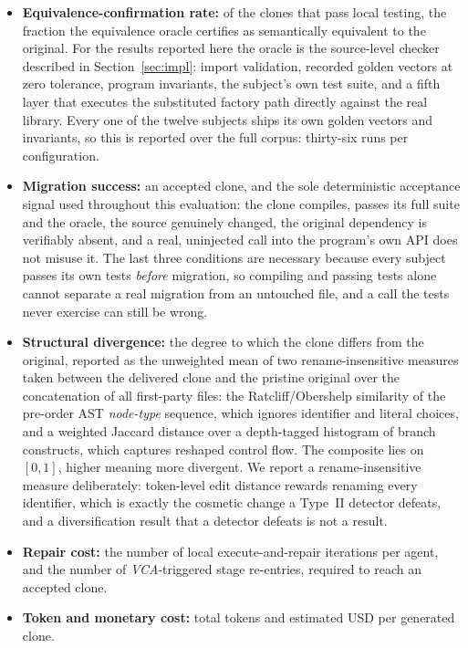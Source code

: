 \begin{itemize}
    \item \textbf{Equivalence-confirmation rate:} of the clones that pass local testing, the fraction the equivalence oracle certifies as semantically equivalent to the original. For the results reported here the oracle is the source-level checker described in Section~\ref{sec:impl}: import validation, recorded golden vectors at zero tolerance, program invariants, the subject's own test suite, and a fifth layer that executes the substituted factory path directly against the real library. Every one of the twelve subjects ships its own golden vectors and invariants, so this is reported over the full corpus: thirty-six runs per configuration.
    \item \textbf{Migration success:} an accepted clone, and the sole deterministic acceptance signal used throughout this evaluation: the clone compiles, passes its full suite and the oracle, the source genuinely changed, the original dependency is verifiably absent, and a real, uninjected call into the program's own API does not misuse it. The last three conditions are necessary because every subject passes its own tests \emph{before} migration, so compiling and passing tests alone cannot separate a real migration from an untouched file, and a call the tests never exercise can still be wrong.
    \item \textbf{Structural divergence:} the degree to which the clone differs from the original, reported as the unweighted mean of two rename-insensitive measures taken between the delivered clone and the pristine original over the concatenation of all first-party files: the Ratcliff/Obershelp similarity of the pre-order AST \emph{node-type} sequence, which ignores identifier and literal choices, and a weighted Jaccard distance over a depth-tagged histogram of branch constructs, which captures reshaped control flow. The composite lies on $[0,1]$, higher meaning more divergent. We report a rename-insensitive measure deliberately: token-level edit distance rewards renaming every identifier, which is exactly the cosmetic change a Type~II detector defeats, and a diversification result that a detector defeats is not a result.
    \item \textbf{Repair cost:} the number of local execute-and-repair iterations per agent, and the number of \emph{VCA}-triggered stage re-entries, required to reach an accepted clone.
    \item \textbf{Token and monetary cost:} total tokens and estimated USD per generated clone.
\end{itemize}

